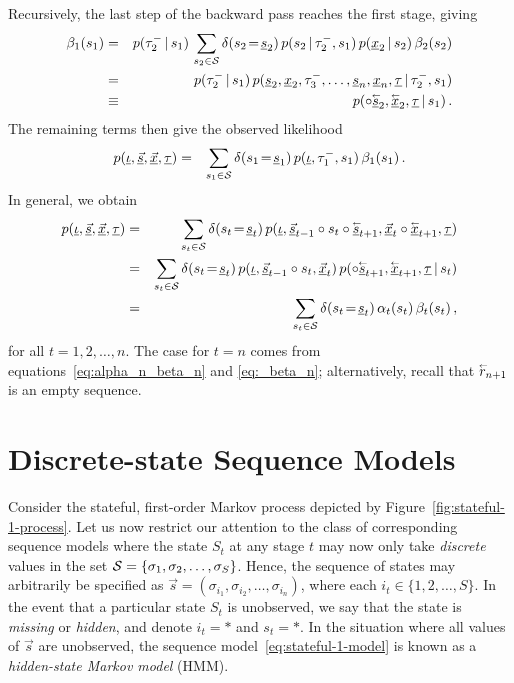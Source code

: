 \documentclass[a4paper]{article}
\newcommand{\rvec}[1]{\accentset{\leftarrow}{#1}}
\newcommand{\ui}{\underline{\iota}}
\newcommand{\ut}{\underline{\tau}}
\begin{document}
Recursively, the last step of the backward pass reaches the first stage, giving
\begin{eqnarray}
  \beta_{1}(s_{1}) & = &
p(\tau^-_2\,|\,s_{1})\,\sum_{s_2\in{\cal S}}\delta(s_2\!=\!\underline{s}_2)\,
p(s_2\,|\,\tau^-_2,s_{1})\,p(\underline{x}_{2}\,|\,s_2)
\,\beta_2(s_2)
\nonumber\\&=&
p(\tau^-_2\,|\,s_{1})\,
p(\underline{s}_2,\underline{x}_2,\tau^-_3,\ldots,\underline{s}_n,\underline{x}_n,\ut\,|\,\tau^-_2,s_{1})
\nonumber\\&\equiv&
p(\circ\underline{\rvec{s}}_2,\underline{\rvec{x}}_2,\ut\,|\,s_{1})\,.
\end{eqnarray}
The remaining terms then give the observed likelihood
\begin{eqnarray}
   p(\ui,\underline{\vec{s}},\underline{\vec{x}},\ut) 
& = & 
   \sum_{s_1\in{\cal S}}\delta(s_1\!=\!\underline{s}_1)\,p(\ui,\tau^-_1,s_1)\,\beta_1(s_1)\,.
\end{eqnarray}
In general, we obtain
\begin{eqnarray}
   p(\ui,\underline{\vec{s}},\underline{\vec{x}},\ut) 
& = & 
   \sum_{s_t\in{\cal S}}\delta(s_t\!=\!\underline{s}_t)\,
   p(\ui,\underline{\vec{s}}_{t-1}\circ s_t\circ\underline{\rvec{s}}_{t+1},
\underline{\vec{x}}_t\circ\underline{\rvec{x}}_{t+1},\ut) 
\nonumber\\&=&
   \sum_{s_t\in{\cal S}}\delta(s_t\!=\!\underline{s}_t)\,
p(\ui,\underline{\vec{s}}_{t-1}\circ s_t,\underline{\vec{x}}_t)
\,p(\circ\underline{\rvec{s}}_{t+1},\underline{\rvec{x}}_{t+1},\ut\,|\,s_{t})
\nonumber\\&=&
   \sum_{s_t\in{\cal S}}\delta(s_t\!=\!\underline{s}_t)\,\alpha_t(s_t)\,\beta_t(s_t)\,,
\end{eqnarray}
for all $t=1,2,\ldots,n$. The case for $t=n$ comes from equations~\eqref{eq:alpha_n_beta_n} and \eqref{eq:_beta_n}; alternatively, recall that $\rvec{r}_{n+1}$ is an empty sequence.

\section{Discrete-state Sequence Models}\label{sec:discrete-state}

Consider the stateful, first-order Markov process depicted by Figure~\ref{fig:stateful-1-process}.
Let us now restrict our attention to the class of corresponding sequence models where
the state $S_t$ at any stage $t$ may now only take {\em discrete} values in the set 
${\cal S}=\{\sigma_1,\sigma_2,\ldots,\sigma_S\}$.
Hence, the sequence of states may arbitrarily be specified as $\vec{s}=(\sigma_{i_1},\sigma_{i_2},\ldots,\sigma_{i_n})$,
where each $i_t\in\{1,2,\ldots,S\}$.
In the event that a particular state $S_t$ is unobserved, we say that the state is {\em missing} or {\em hidden},
and denote $i_t=*$ and $s_t=*$. In the situation where all values of $\vec{s}$ are unobserved,
the sequence model~\eqref{eq:stateful-1-model} is known as a {\em hidden-state Markov model} (HMM).
\end{document}
